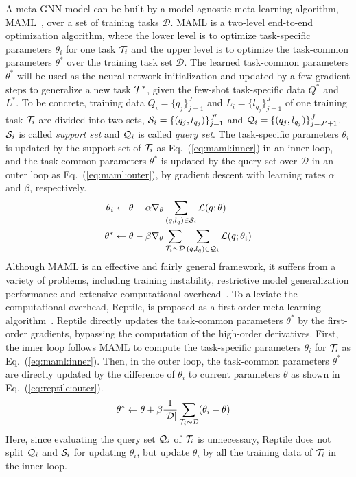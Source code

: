  A meta GNN model can be built by a model-agnostic meta-learning algorithm, MAML~\cite{MAML}, over a set of training tasks $\mathcal{D}$.
MAML is a two-level end-to-end optimization algorithm, where the lower level is to optimize task-specific parameters $\theta_i$ for one task $\mathcal{T}_i$ and the upper level is to optimize the task-common parameters $\theta^*$ over the training task set $\mathcal{D}$. 
The learned task-common parameters $\theta^*$ will be used as the neural network initialization and updated by a few gradient steps to generalize a new task $\mathcal{T}^*$, given the few-shot task-specific data $Q^*$ and $L^*$.
To be concrete, training data $Q_i = \{q_{j}\}_{j = 1}^{J}$ and $L_i = \{l_{q_j}\}_{j = 1}^{J}$ of one training task $\mathcal{T}_i$ are divided into two sets, $\mathcal{S}_i = \{(q_{j}, l_{q_j})\}_{j = 1}^{J'}$ and $\mathcal{Q}_i = \{(q_{j}, l_{q_j})\}_{j = J' + 1}^{J}$. $\mathcal{S}_i$ is called \emph{support set} and $\mathcal{Q}_i$ is called \emph{query set}. The task-specific parameters $\theta_i$ is updated by the support set of $\mathcal{T}_i$ as Eq.~(\ref{eq:maml:inner}) in an inner loop, and the task-common parameters $\theta^*$ is updated by the query set over $\mathcal{D}$ in an outer loop as Eq.~(\ref{eq:maml:outer}), by gradient descent with learning rates $\alpha$ and $\beta$, respectively. %
%
\begin{align}
	\theta_i & \leftarrow \theta - \alpha \nabla_{\theta} \sum_{(q, l_q) \in \mathcal{S}_i}\mathcal{L}(q; \theta) \label{eq:maml:inner}\\
	\theta^*  & \leftarrow \theta -\beta \nabla_{\theta} \sum_{\mathcal{T}_i \sim \mathcal{D}} \sum_{(q, l_q) \in \mathcal{Q}_i}\mathcal{L}(q; \theta_i)  \label{eq:maml:outer}
\end{align}
%
Although MAML is an effective and fairly general framework, it suffers
from a variety of problems, including training instability,
restrictive model generalization performance and extensive
computational overhead~\cite{DBLP:conf/iclr/AntoniouES19}.  To
alleviate the computational overhead, Reptile, is proposed as a
first-order meta-learning algorithm~\cite{reptile}.  Reptile directly
updates the task-common parameters $\theta^*$ by the first-order
gradients, bypassing the computation of the high-order
derivatives. First, the inner loop follows MAML to compute the
task-specific parameters $\theta_{i}$ for $\mathcal{T}_i$ as
Eq.~(\ref{eq:maml:inner}). Then, in the outer loop, the task-common
parameters $\theta^*$ are directly updated by the difference of
$\theta_{i}$ to current parameters $\theta$ as shown in
Eq.~(\ref{eq:reptile:outer}).
%
\begin{align}
\theta^*  & \leftarrow \theta + \beta \frac{1}{|\mathcal{D}|}\sum_{\mathcal{T}_i \sim \mathcal{D}}(\theta_i-\theta) \label{eq:reptile:outer}
\end{align}
Here, since evaluating the query set $\mathcal{Q}_i$ of $\mathcal{T}_i$ is unnecessary,
Reptile does not split $\mathcal{Q}_i$ and $\mathcal{S}_i$ for updating $\theta_i$, but update $\theta_i$ by all the training data of $\mathcal{T}_i$ in the inner loop.

